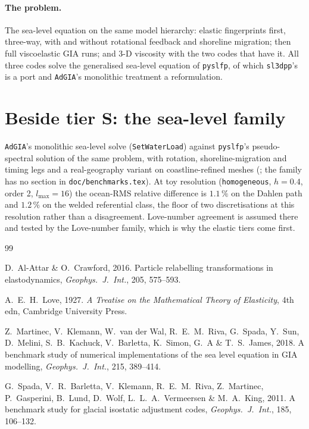 \documentclass[11pt]{article}
\numberwithin{equation}{section}
\newcommand{\code}[1]{\texttt{#1}}
\begin{document}
\paragraph{The problem.} The sea-level equation on the same model
hierarchy: elastic fingerprints first, three-way, with and without
rotational feedback and shoreline migration; then full viscoelastic GIA
runs; and 3-D viscosity with the two codes that have it. All three codes
solve the generalised sea-level equation of \code{pyslfp}, of which
\code{sl3dpp}'s is a port and \code{AdGIA}'s monolithic treatment a
reformulation.

\section{Beside tier S: the sea-level family}
\label{sec:internal-sea}

\code{AdGIA}'s monolithic sea-level solve (\code{SetWaterLoad}) against
\code{pyslfp}'s pseudo-spectral solution of the same problem, with
rotation, shoreline-migration and timing legs and a real-geography variant
on coastline-refined meshes (; the
family has no section in \code{doc/benchmarks.tex}). At toy resolution
(\code{homogeneous}, $h=0.4$, order 2, $l_{\max}=16$) the ocean-RMS
relative difference is $1.1\,\%$ on the Dahlen path and $1.2\,\%$ on the
welded referential class, the floor of two discretisations at this
resolution rather than a disagreement. Love-number agreement is assumed there and tested by
the Love-number family, which is why the elastic tiers come first.

\begin{thebibliography}{99}

D.~Al-Attar \& O.~Crawford, 2016.
Particle relabelling transformations in elastodynamics,
\emph{Geophys.\ J.\ Int.}, 205, 575--593.

A.~E.~H.~Love, 1927.
\emph{A Treatise on the Mathematical Theory of Elasticity}, 4th edn,
Cambridge University Press.

Z.~Martinec, V.~Klemann, W.~van der Wal, R.~E.~M.~Riva, G.~Spada, Y.~Sun,
D.~Melini, S.~B.~Kachuck, V.~Barletta, K.~Simon, G.~A \& T.~S.~James, 2018.
A benchmark study of numerical implementations of the sea level equation in
GIA modelling, \emph{Geophys.\ J.\ Int.}, 215, 389--414.

G.~Spada, V.~R.~Barletta, V.~Klemann, R.~E.~M.~Riva, Z.~Martinec,
P.~Gasperini, B.~Lund, D.~Wolf, L.~L.~A.~Vermeersen \& M.~A.~King, 2011.
A benchmark study for glacial isostatic adjustment codes,
\emph{Geophys.\ J.\ Int.}, 185, 106--132.

\end{thebibliography}
\end{document}
